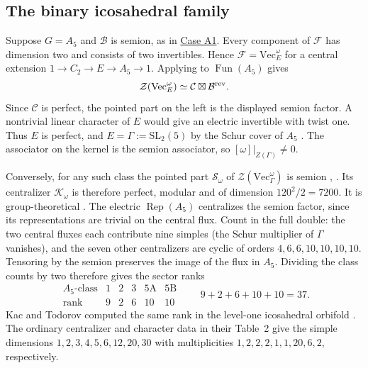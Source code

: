 \documentclass[11pt]{amsart}
\numberwithin{equation}{section}
\theoremstyle{definition}
\theoremstyle{plain}
\newcommand{\C}{\mathcal C}
\begin{document}
\subsection{The binary icosahedral family}\label{ext:binary}
Suppose $G=A_5$ and $\mathcal B$ is semion, as in
\hyperref[ext:neutral-A1]{Case A1}. Every component of $\mathcal F$ has dimension two
and consists of two invertibles. Hence $\mathcal F=\mathrm{Vec}_E^\omega$
for a central extension $1\to C_2\to E\to A_5\to1$. Applying
\cite[Corollary~3.30]{DMNOWitt} to $\operatorname{Fun}(A_5)$ gives
\[
 \mathcal Z(\mathrm{Vec}_E^\omega)\simeq \C\boxtimes\mathcal B^{\rm rev}.
\]
Since $\C$ is perfect, the pointed part on the left is the displayed semion
factor. A nontrivial linear character of $E$ would give an electric invertible
with twist one. Thus $E$ is perfect, and $E=\Gamma:=\mathrm{SL}_2(5)$
by the Schur cover of $A_5$ \cite{AtlasA5}. The associator on the kernel
is the semion associator, so $[\omega]|_{Z(\Gamma)}\ne0$.

Conversely, for any such class the pointed part $\mathcal S_\omega$ of
$\mathcal Z(\mathrm{Vec}_\Gamma^\omega)$ is semion
\cite[Example~2.1]{BGHNPRW}, \cite[\S4, Example~3]{MasonNgOrbifolds}.
Its centralizer $\mathcal K_\omega$ is therefore perfect, modular and
of dimension $120^2/2=7200$. It is group-theoretical
\cite[Proposition~8.44(i)]{ENOannals}.
The electric $\operatorname{Rep}(A_5)$ centralizes the semion factor,
since its representations are trivial on the central flux. Count in
the full double:
the two central fluxes each contribute nine simples (the Schur
multiplier of $\Gamma$ vanishes), and the seven other centralizers
are cyclic of orders $4,6,6,10,10,10,10$. Tensoring by the semion preserves the image of the flux in $A_5$.
Dividing the class counts by two therefore gives the sector ranks
\[
 \begin{array}{c|ccccc}
 A_5\text{-class}&1&2&3&5\mathrm A&5\mathrm B\\ \hline
 \text{rank}&9&2&6&10&10
 \end{array}
 \qquad 9+2+6+10+10=37.
\]
Kac and Todorov computed the same rank in the level-one icosahedral
orbifold \cite[\S6B, before Table~2]{KacTodorov}. The ordinary centralizer
and character data in their Table~2 give the simple dimensions
$1,2,3,4,5,6,12,20,30$ with multiplicities $1,2,2,2,1,1,20,6,2$,
respectively.
\end{document}

